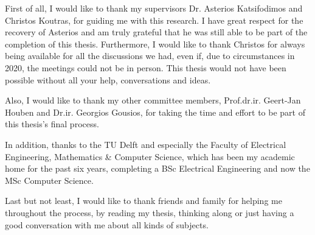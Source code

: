 \documentclass[
11pt, %
english, %
singlespacing, %
headsepline, %
]{MastersDoctoralThesis} %
\begin{document}

\begin{acknowledgements}
\addchaptertocentry{\acknowledgementname} %
First of all, I would like to thank my supervisors Dr. Asterios Katsifodimos and Christos Koutras, for guiding me with this research. I have great respect for the recovery of Asterios and am truly grateful that he was still able to be part of the completion of this thesis. Furthermore, I would like to thank Christos for always being available for all the discussions we had, even if, due to circumstances in 2020, the meetings could not be in person. This thesis would not have been possible without all your help, conversations and ideas.

Also, I would like to thank my other committee members, Prof.dr.ir. Geert-Jan Houben and Dr.ir. Georgios Gousios, for taking the time and effort to be part of this thesis's final process. 

In addition, thanks to the TU Delft and especially the Faculty of Electrical Engineering, Mathematics \& Computer Science, which has been my academic home for the past six years, completing a BSc Electrical Engineering and now the MSc Computer Science.

Last but not least, I would like to thank friends and family for helping me throughout the process, by reading my thesis, thinking along or just having a good conversation with me about all kinds of subjects.


\end{acknowledgements}


\tableofcontents %

\listoffigures %

\listoftables %

\end{document}
